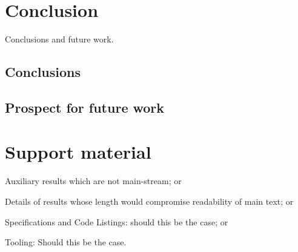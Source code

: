 \documentclass[
  oneside,
  11pt, a4paper,
  footinclude=true,
  headinclude=true,
  cleardoublepage=empty
]{scrbook}
\begin{document}
	\chapter{Conclusion}
		Conclusions and future work.
	\section{Conclusions}
	\section{Prospect for future work}
			

	

	
	
	
	\chapter{Support material}
	Auxiliary results which are not main-stream; or

	Details of results whose length would compromise readability of main text; or

	Specifications and Code Listings: should this be the case; or

	Tooling: Should this be the case.



\end{document}
